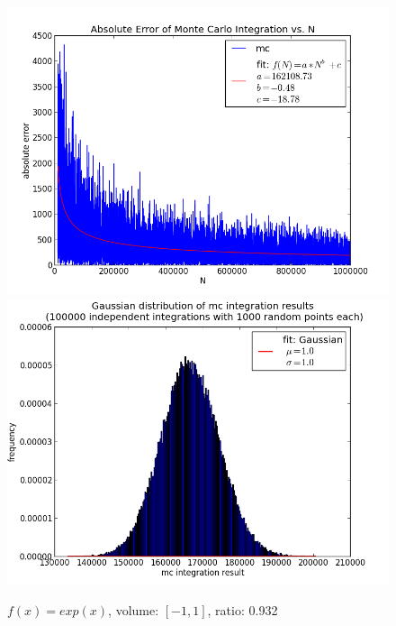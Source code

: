 \documentclass[12pt,a4paper,titlepage]{article}
\begin{document}
\begin{appendix}
\begin{figure}
	\begin{minipage}[b]{\linewidth}
		\centering
		\includegraphics[width=\linewidth]{Plots/x5}
	\end{minipage}
	\begin{minipage}[b]{\linewidth}
		\centering
		\includegraphics[width=\linewidth]{Plots/x5_HIST}
	\end{minipage}
	\label{fig:linear}
\end{figure}
\begin{figure}
	\centering
	\caption{$f(x)=exp(x)$, volume: $[-1,1]$, ratio: 0.932}
	\begin{minipage}[b]{\linewidth}
		\centering

\end{minipage}
\end{figure}
\end{appendix}
\end{document}
